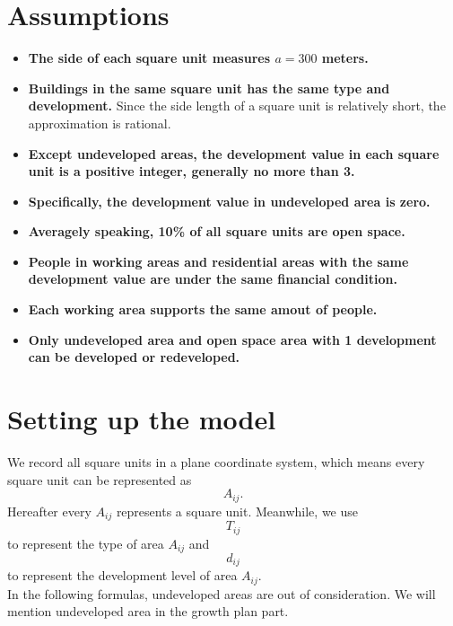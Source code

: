 
\section{Assumptions}
\begin{itemize}
  \item \textbf{The side of each square unit measures $a = 300$ meters.}
  \item \textbf{Buildings in the same square unit has the same type and development.} Since the side length of a square unit is relatively short, the approximation is rational.
  \item \textbf{Except undeveloped areas, the development value in each square unit is a positive integer, generally no more than 3.}
  \item \textbf{Specifically, the development value in undeveloped area is zero.}
  \item \textbf{Averagely speaking, 10\% of all square units are open space.}
  \item \textbf{People in working areas and residential areas with the same development value are under the same financial condition.}
  \item \textbf{Each working area supports the same amout of people.}
  \item \textbf{Only undeveloped area and open space area with 1 development can be developed or redeveloped.}
\end{itemize}


\section{Setting up the model}
We record all square units in a plane coordinate system, which means every square unit can be represented as $$ A_{ij}. $$
Hereafter every $ A_{ij} $ represents a square unit.
Meanwhile, we use $$ T_{ij} $$ to represent the type of area $ A_{ij} $ and $$ d_{ij} $$ to represent the development level of area $ A_{ij} $.
\\
In the following formulas, undeveloped areas are out of consideration. We will mention undeveloped area in the growth plan part.
\\
